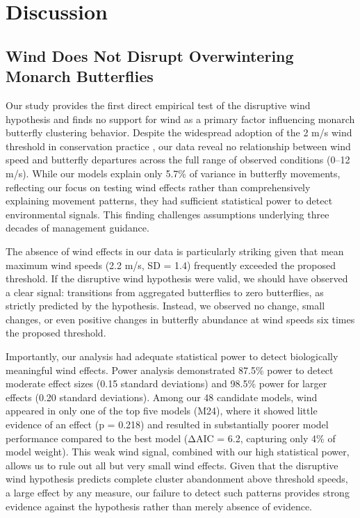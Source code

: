 \section{Discussion}

\subsection{Wind Does Not Disrupt Overwintering Monarch Butterflies}

Our study provides the first direct empirical test of the disruptive wind hypothesis and finds no support for wind as a primary factor influencing monarch butterfly clustering behavior. Despite the widespread adoption of the 2 m/s wind threshold in conservation practice \autocite{Society2016_WFJMUMAD}, our data reveal no relationship between wind speed and butterfly departures across the full range of observed conditions (0--12 m/s). While our models explain only 5.7\% of variance in butterfly movements, reflecting our focus on testing wind effects rather than comprehensively explaining movement patterns, they had sufficient statistical power to detect environmental signals. This finding challenges assumptions underlying three decades of management guidance.

The absence of wind effects in our data is particularly striking given that mean maximum wind speeds (2.2 m/s, SD = 1.4) frequently exceeded the proposed threshold. If the disruptive wind hypothesis were valid, we should have observed a clear signal: transitions from aggregated butterflies to zero butterflies, as strictly predicted by the hypothesis. Instead, we observed no change, small changes, or even positive changes in butterfly abundance at wind speeds six times the proposed threshold. 

Importantly, our analysis had adequate statistical power to detect biologically meaningful wind effects. Power analysis demonstrated 87.5\% power to detect moderate effect sizes (0.15 standard deviations) and 98.5\% power for larger effects (0.20 standard deviations). Among our 48 candidate models, wind appeared in only one of the top five models (M24), where it showed little evidence of an effect (p = 0.218) and resulted in substantially poorer model performance compared to the best model (ΔAIC = 6.2, capturing only 4\% of model weight). This weak wind signal, combined with our high statistical power, allows us to rule out all but very small wind effects. Given that the disruptive wind hypothesis predicts complete cluster abandonment above threshold speeds, a large effect by any measure, our failure to detect such patterns provides strong evidence against the hypothesis rather than merely absence of evidence.

